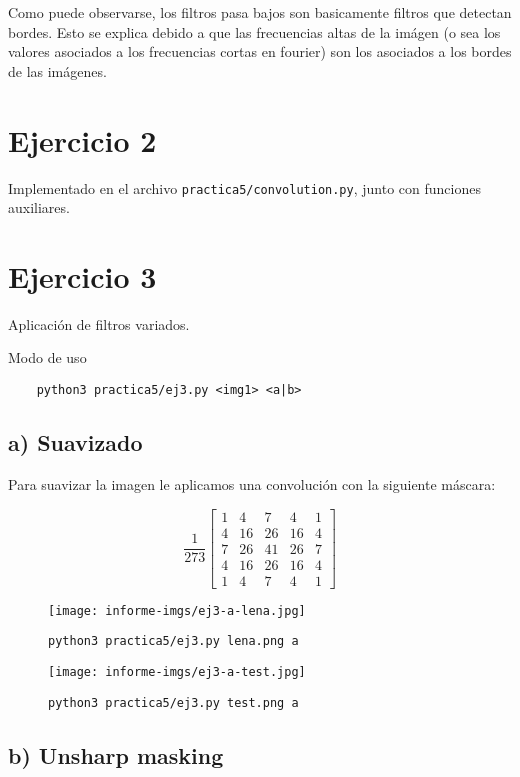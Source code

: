 \documentclass[11pt, spanish]{article}
\begin{document}
Como puede observarse, los filtros pasa bajos son basicamente filtros que detectan bordes.
Esto se explica debido a que las frecuencias altas de la imágen
(o sea los valores asociados a los frecuencias cortas en fourier)
son los asociados a los bordes de las imágenes.

\newpage
\section{Ejercicio 2}

Implementado en el archivo \texttt{practica5/convolution.py}, junto con funciones auxiliares.

\newpage
\section{Ejercicio 3}

Aplicación de filtros variados.

Modo de uso
\begin{verbatim}
    python3 practica5/ej3.py <img1> <a|b>
\end{verbatim}

\subsection{a) Suavizado}

Para suavizar la imagen le aplicamos una convolución con la siguiente máscara:

\[
\frac{1}{273}
\begin{bmatrix}
1 & 4 & 7 & 4 & 1 \\
4 & 16 & 26 & 16 & 4 \\
7 & 26 & 41 & 26 & 7 \\
4 & 16 & 26 & 16 & 4 \\
1 & 4 & 7 & 4 & 1
\end{bmatrix}
\]

\begin{figure}[H]
\centering
  \texttt{[image: informe-imgs/ej3-a-lena.jpg]}
  \caption{\texttt{python3 practica5/ej3.py lena.png a}}
\end{figure}


\begin{figure}[H]
\centering
  \texttt{[image: informe-imgs/ej3-a-test.jpg]}
  \caption{\texttt{python3 practica5/ej3.py test.png a}}
\end{figure}

\subsection{b) Unsharp masking}
\end{document}
